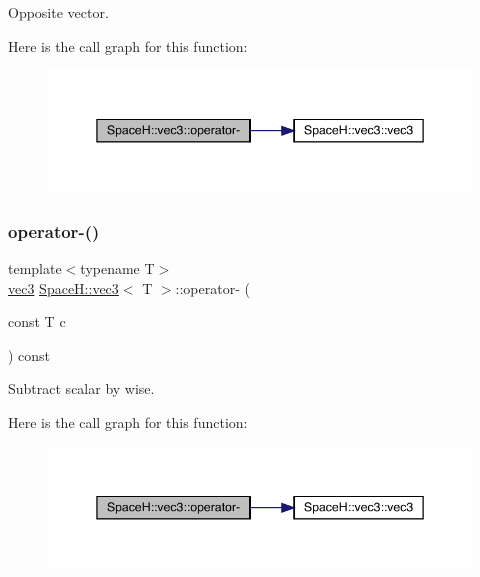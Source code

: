 Opposite vector. 

Here is the call graph for this function\+:
\nopagebreak
\begin{figure}[H]
\begin{center}
\leavevmode
\includegraphics[width=345pt]{struct_space_h_1_1vec3_a74db760e195c089b32b5319e9d45028e_cgraph}
\end{center}
\end{figure}
\mbox{\label{struct_space_h_1_1vec3_a05e464381d8e6757e6604fd42a62fec6}} 
\subsubsection{\texorpdfstring{operator-\/()}{operator-()}\hspace{0.1cm}{\footnotesize\ttfamily [8/11]}}
{\footnotesize\ttfamily template$<$typename T$>$ \\
\mbox{\hyperlink{struct_space_h_1_1vec3}{vec3}} \mbox{\hyperlink{struct_space_h_1_1vec3}{Space\+H\+::vec3}}$<$ T $>$\+::operator-\/ (\begin{DoxyParamCaption}\item[{const T}]{c }\end{DoxyParamCaption}) const\hspace{0.3cm}{\ttfamily [inline]}}



Subtract scalar by wise. 

Here is the call graph for this function\+:
\nopagebreak
\begin{figure}[H]
\begin{center}
\leavevmode
\includegraphics[width=345pt]{struct_space_h_1_1vec3_a05e464381d8e6757e6604fd42a62fec6_cgraph}
\end{center}
\end{figure}
\mbox{\label{struct_space_h_1_1vec3_a74db760e195c089b32b5319e9d45028e}} 
